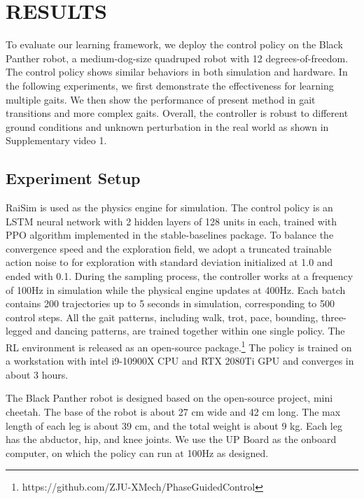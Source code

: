 \documentclass[letterpaper, 10 pt, journal, twoside]{IEEEtran} %
\begin{document}
\section{RESULTS}
To evaluate our learning framework, we deploy the control policy on the Black Panther robot, a medium-dog-size quadruped robot with 12 degrees-of-freedom. The control policy shows similar behaviors in both simulation and hardware. In the following experiments, we first demonstrate the effectiveness for learning multiple gaits. We then show the performance of present method in gait transitions and more complex gaits. Overall, the controller is robust to different ground conditions and unknown perturbation in the real world as shown in Supplementary video 1.

\subsection{Experiment Setup}
RaiSim\cite{raisim} is used as the physics engine for simulation. The control policy is an LSTM neural network with 2 hidden layers of 128 units in each, trained with PPO algorithm\cite{schulman2017proximal} implemented in the stable-baselines\cite{stable-baselines} package. To balance the convergence speed and the exploration field, we adopt a truncated trainable action noise to for exploration with standard deviation initialized at 1.0 and ended with 0.1. During the sampling process, the controller works at a frequency of 100Hz in simulation while the physical engine updates at 400Hz. Each batch contains 200 trajectories up to 5 seconds in simulation, corresponding to 500 control steps. All the gait patterns, including walk, trot, pace, bounding, three-legged and dancing patterns, are trained together within one single policy. The RL environment is released as an open-source package.\footnote{https://github.com/ZJU-XMech/PhaseGuidedControl} The policy is trained on a workstation with intel i9-10900X CPU and RTX 2080Ti GPU and converges in about 3 hours.

The Black Panther robot is designed based on the open-source project, mini cheetah\cite{katz2019}. The base of the robot is about 27 cm wide and 42 cm long. The max length of each leg is about 39 cm, and the total weight is about 9 kg. Each leg has the abductor, hip, and knee joints. We use the UP Board as the onboard computer, on which the policy can run at 100Hz as designed.
\end{document}
